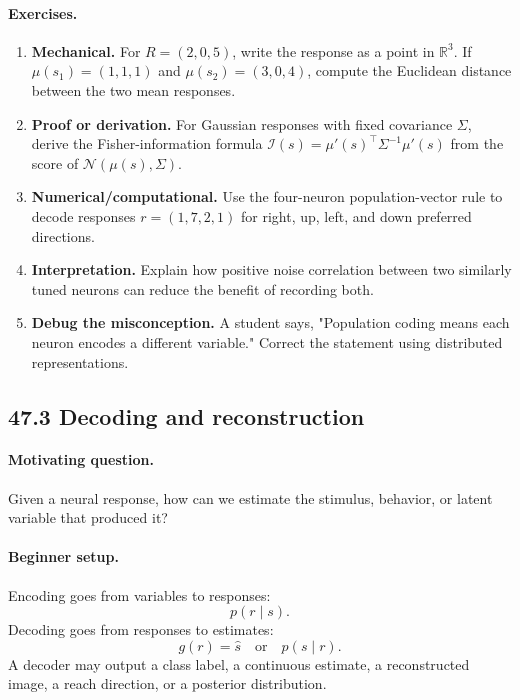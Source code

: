 \paragraph{Exercises.}
\begin{enumerate}[label=\textbf{47.2.\arabic*.}, leftmargin=*]
\item \textbf{Mechanical.} For \(R=(2,0,5)\), write the response as a point in \(\mathbb R^3\). If \(\mu(s_1)=(1,1,1)\) and \(\mu(s_2)=(3,0,4)\), compute the Euclidean distance between the two mean responses.
\item \textbf{Proof or derivation.} For Gaussian responses with fixed covariance \(\Sigma\), derive the Fisher-information formula \(\mathcal I(s)=\mu'(s)^\top\Sigma^{-1}\mu'(s)\) from the score of \(\mathcal N(\mu(s),\Sigma)\).
\item \textbf{Numerical/computational.} Use the four-neuron population-vector rule to decode responses \(r=(1,7,2,1)\) for right, up, left, and down preferred directions.
\item \textbf{Interpretation.} Explain how positive noise correlation between two similarly tuned neurons can reduce the benefit of recording both.
\item \textbf{Debug the misconception.} A student says, "Population coding means each neuron encodes a different variable." Correct the statement using distributed representations.
\end{enumerate}

\subsection{47.3 Decoding and reconstruction}

\paragraph{Motivating question.}
Given a neural response, how can we estimate the stimulus, behavior, or latent variable that produced it?

\paragraph{Beginner setup.}
Encoding goes from variables to responses:
\[
p(r\mid s).
\]
Decoding goes from responses to estimates:
\[
g(r)=\widehat s
\quad\text{or}\quad
p(s\mid r).
\]
A decoder may output a class label, a continuous estimate, a reconstructed image, a reach direction, or a posterior distribution.

